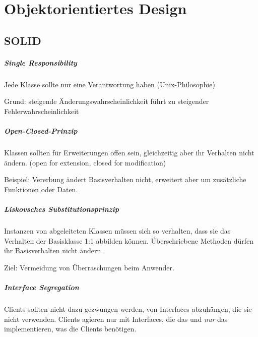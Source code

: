 \chapter{Objektorientiertes Design}\label{objektorientiertes-design}

\section{SOLID}\label{solid}

\paragraph{Single Responsibility}\label{single-responsibility}

Jede Klasse sollte nur eine Verantwortung haben (Unix-Philosophie)

Grund: steigende Änderungswahrscheinlichkeit führt zu steigender
Fehlerwahrscheinlichkeit

\paragraph{Open-Closed-Prinzip}\label{open-closed-prinzip}

Klassen sollten für Erweiterungen offen sein, gleichzeitig aber ihr
Verhalten nicht ändern. (open for extension, closed for modification)

Beispiel: Vererbung ändert Basisverhalten nicht, erweitert aber um
zusätzliche Funktionen oder Daten.

\paragraph{Liskovsches Substitutionsprinzip}\label{liskovsches-substitutionsprinzip}

Instanzen von abgeleiteten Klassen müssen sich so verhalten, dass sie
das Verhalten der Basisklasse 1:1 abbilden können. Überschriebene
Methoden dürfen ihr Basisverhalten nicht ändern.

Ziel: Vermeidung von Überraschungen beim Anwender.

\paragraph{Interface Segregation}\label{interface-segregation}

Clients sollten nicht dazu gezwungen werden, von Interfaces abzuhängen,
die sie nicht verwenden. Clients agieren nur mit Interfaces, die das und
\emph{nur} das implementieren, was die Clients benötigen.

